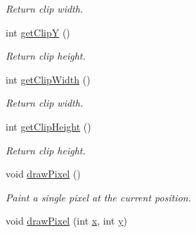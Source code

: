 \begin{DoxyCompactItemize}
\begin{DoxyCompactList}\small\item\em Return clip width. \end{DoxyCompactList}\item 
\hypertarget{classGUI_1_1Drawable_a7a3482fe39959b477bb3fb5f8b401cd1}{int \hyperlink{classGUI_1_1Drawable_a7a3482fe39959b477bb3fb5f8b401cd1}{get\-Clip\-Y} ()}\label{classGUI_1_1Drawable_a7a3482fe39959b477bb3fb5f8b401cd1}

\begin{DoxyCompactList}\small\item\em Return clip height. \end{DoxyCompactList}\item 
\hypertarget{classGUI_1_1Drawable_aaf2367001376101556076c424b7bd181}{int \hyperlink{classGUI_1_1Drawable_aaf2367001376101556076c424b7bd181}{get\-Clip\-Width} ()}\label{classGUI_1_1Drawable_aaf2367001376101556076c424b7bd181}

\begin{DoxyCompactList}\small\item\em Return clip width. \end{DoxyCompactList}\item 
\hypertarget{classGUI_1_1Drawable_ac63bf6c4a6b3b6ea6a32cec0cd6182a2}{int \hyperlink{classGUI_1_1Drawable_ac63bf6c4a6b3b6ea6a32cec0cd6182a2}{get\-Clip\-Height} ()}\label{classGUI_1_1Drawable_ac63bf6c4a6b3b6ea6a32cec0cd6182a2}

\begin{DoxyCompactList}\small\item\em Return clip height. \end{DoxyCompactList}\item 
\hypertarget{classGUI_1_1Drawable_af1fa4e18fd41af9e5251d6371d8912b8}{void \hyperlink{classGUI_1_1Drawable_af1fa4e18fd41af9e5251d6371d8912b8}{draw\-Pixel} ()}\label{classGUI_1_1Drawable_af1fa4e18fd41af9e5251d6371d8912b8}

\begin{DoxyCompactList}\small\item\em Paint a single pixel at the current position. \end{DoxyCompactList}\item 
\hypertarget{classGUI_1_1Drawable_ae29880e7c96a41fdacef5a154f216c5d}{void \hyperlink{classGUI_1_1Drawable_ae29880e7c96a41fdacef5a154f216c5d}{draw\-Pixel} (int \hyperlink{classGUI_1_1Drawable_a098294925bd310aa41080a2441790b80}{x}, int \hyperlink{classGUI_1_1Drawable_a574c99954cc268937f2c66ebe1332316}{y})}\label{classGUI_1_1Drawable_ae29880e7c96a41fdacef5a154f216c5d}


\end{DoxyCompactItemize}
